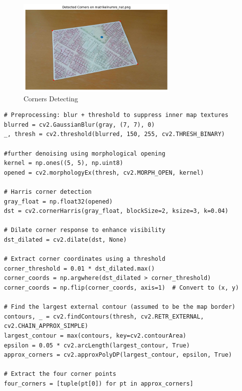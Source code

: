 \documentclass[12pt]{article}
\begin{document}
\subsection{}
\begin{figure}[ht]
    \centering
    \includegraphics[width=0.7\textwidth]{pics/a7-2.1.png}
    \caption{Corners Detecting}
    \label{2.1}
\end{figure}

\begin{lstlisting}
# Preprocessing: blur + threshold to suppress inner map textures
blurred = cv2.GaussianBlur(gray, (7, 7), 0)
_, thresh = cv2.threshold(blurred, 150, 255, cv2.THRESH_BINARY)

#further denoising using morphological opening
kernel = np.ones((5, 5), np.uint8)
opened = cv2.morphologyEx(thresh, cv2.MORPH_OPEN, kernel)

# Harris corner detection
gray_float = np.float32(opened)
dst = cv2.cornerHarris(gray_float, blockSize=2, ksize=3, k=0.04)

# Dilate corner response to enhance visibility
dst_dilated = cv2.dilate(dst, None)

# Extract corner coordinates using a threshold
corner_threshold = 0.01 * dst_dilated.max()
corner_coords = np.argwhere(dst_dilated > corner_threshold)
corner_coords = np.flip(corner_coords, axis=1)  # Convert to (x, y)

# Find the largest external contour (assumed to be the map border)
contours, _ = cv2.findContours(thresh, cv2.RETR_EXTERNAL, cv2.CHAIN_APPROX_SIMPLE)
largest_contour = max(contours, key=cv2.contourArea)
epsilon = 0.05 * cv2.arcLength(largest_contour, True)
approx_corners = cv2.approxPolyDP(largest_contour, epsilon, True)

# Extract the four corner points
four_corners = [tuple(pt[0]) for pt in approx_corners]

\end{lstlisting}
\end{document}
